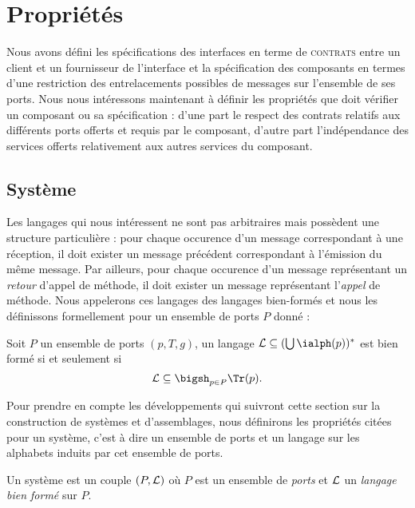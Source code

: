 \section{Propri\'et\'es}

Nous avons d\'efini les sp\'ecifications des interfaces en terme de
\textsc{contrats} entre un client et un fournisseur de l'interface et
la sp\'ecification des composants en termes d'une restriction des
entrelacements possibles de messages sur l'ensemble de ses ports. Nous
nous int\'eressons maintenant \`a d\'efinir les propri\'et\'es
que doit v\'erifier un composant ou sa sp\'ecification : d'une part
le respect des contrats relatifs aux diff\'erents ports offerts et
requis par le composant, d'autre part l'ind\'ependance des services
offerts relativement aux autres services du composant. 

\subsection{Syst\`eme}

Les langages qui nous int\'eressent ne sont pas arbitraires mais
poss\`edent une structure particuli\`ere : pour chaque occurence
d'un message correspondant \`a une r\'eception, il doit exister un
message pr\'ec\'edent correspondant \`a l'\'emission du m\^eme message. Par ailleurs, pour chaque
occurence d'un message repr\'esentant un \emph{retour} d'appel de
m\'ethode, il doit exister un message repr\'esentant l'\emph{appel}
de m\'ethode. Nous appelerons ces langages des langages
bien-form\'es et nous les d\'efinissons formellement pour un
ensemble de ports $P$ donn\'e :

\begin{definition}
\label{def:langwf}
    Soit $P$ un ensemble de ports $(p,T,g)$, un langage ${\cal L}
    \subseteq (\bigcup \ialph(p))^*$ est bien form\'e si
    et seulement si 
    $$
    {\cal L} \subseteq \bigsh_{p\in P} \Tr(p).
    $$
\end{definition}

Pour prendre en
compte les d\'eveloppements qui suivront cette section sur la
construction de syst\`emes et d'assemblages, nous d\'efinirons les
propri\'et\'es cit\'ees pour un \og syst\`eme\fg{}, c'est \`a
dire un ensemble de ports et un langage sur les alphabets induits par
cet ensemble de ports.  

\begin{definition}
\label{def:systeme}
Un syst\`eme est un couple $(P,{\cal L})$ o\`u $P$ est un ensemble
de \emph{ports} et $\cal L$ un \emph{langage bien form\'e} sur $P$.
\end{definition}


